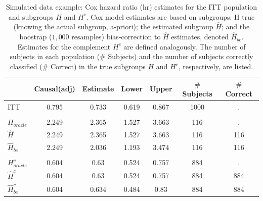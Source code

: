 \documentclass[12pt]{article}
\begin{document}
\begin{table}

\caption{\label{tab:simex_tab}\label{tab:simex} Simulated data example: Cox hazard ratio (hr) estimates for the ITT population and subgroups $H$ and $H^{c}$.
Cox model estimates are based on subgroups: H true (knowing the actual subgroup, a-priori); the estimated subgroup $\hat{H}$; and 
the boostrap ($1,000$ resamples) bias-correction to $\hat{H}$ estimates, denoted $\hat{H}_{bc}$.  Estimates for the complement $H^{c}$ are defined analogously.
The number of subjects in each population ($\#$ Subjects) and the number of subjects correctly classified ($\#$ Correct) in the true subgroups $H$ and $H^{c}$, respectively, are listed.}
\centering
\fontsize{9}{11}\selectfont
\begin{tabular}[t]{lcccccc}
\toprule
  & Causal(adj) & Estimate & Lower & Upper & $\#$ Subjects & $\#$ Correct\\
\midrule
ITT & 0.795 & 0.733 & 0.619 & 0.867 & 1000 & .\\
\addlinespace[0.3em]
\multicolumn{7}{l}{\textbf{H subgroup estimates}}\\
\hspace{1em}$H_{oracle}$ & 2.249 & 2.365 & 1.527 & 3.663 & 116 & .\\
\hspace{1em}$\hat{H}$ & 2.249 & 2.365 & 1.527 & 3.663 & 116 & 116\\
\hspace{1em}$\hat{H}_{bc}$ & 2.249 & 2.036 & 1.193 & 3.474 & 116 & 116\\
\addlinespace[0.3em]
\multicolumn{7}{l}{\textbf{H-complement subgroup estimates}}\\
\hspace{1em}$H^{c}_{oracle}$ & 0.604 & 0.63 & 0.524 & 0.757 & 884 & .\\
\hspace{1em}$\hat{H}^{c}$ & 0.604 & 0.63 & 0.524 & 0.757 & 884 & 884\\
\hspace{1em}$\hat{H}^{c}_{bc}$ & 0.604 & 0.634 & 0.484 & 0.83 & 884 & 884\\
\bottomrule
\end{tabular}
\end{table}




 

\end{document}
